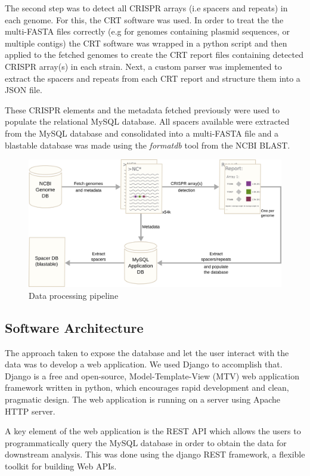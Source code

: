 \documentclass[11pt, a4paper,titlepage]{article}
\begin{document}
The second step was to detect all CRISPR arrays (i.e spacers and
repeats) in each genome. For this, the CRT software
\cite{bland2007crispr} was used. In order to treat the the multi-FASTA
files correctly (e.g for genomes containing plasmid sequences, or
multiple contigs) the CRT software was wrapped in a python script and
then applied to the fetched genomes to create the CRT report files
containing detected CRISPR array(s) in each strain. Next, a custom
parser was implemented to extract the spacers and repeats from each
CRT report and structure them into a JSON file.

These CRISPR elements and the metadata fetched previously were used to
populate the relational MySQL database. All spacers available were
extracted from the MySQL database and consolidated into a multi-FASTA
file and a blastable database was made using the \emph{formatdb} tool
from the NCBI BLAST.

\begin{figure}
  \centering
  \includegraphics[scale=0.5]{figures/pipeline.png}
  \caption{Data processing pipeline}
\end{figure}

\subsection{Software Architecture}

The approach taken to expose the database and let the user interact
with the data was to develop a web application. We used Django to
accomplish that. Django is a free and open-source, Model-Template-View
(MTV) web application framework written in python, which encourages
rapid development and clean, pragmatic design. The web application is
running on a server using Apache HTTP server.

A key element of the web application is the REST API which allows the
users to programmatically query the MySQL database in order to obtain
the data for downstream analysis. This was done using the django REST
framework, a flexible toolkit for building Web APIs.
\end{document}
